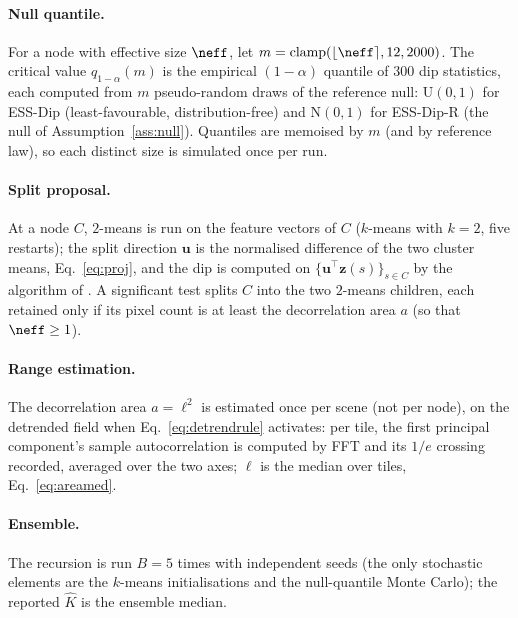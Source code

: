 \paragraph{Null quantile.}
For a node with effective size $\neff$, let
$m=\operatorname{clamp}(\lfloor\neff\rceil,12,2000)$. The critical value
$q_{1-\alpha}(m)$ is the empirical $(1-\alpha)$ quantile of $300$ dip
statistics, each computed from $m$ pseudo-random draws of the reference null:
$\mathrm{U}(0,1)$ for ESS-Dip (least-favourable, distribution-free) and
$\mathrm{N}(0,1)$ for ESS-Dip-R (the null of Assumption~\ref{ass:null}).
Quantiles are memoised by $m$ (and by reference law), so each distinct size is
simulated once per run.

\paragraph{Split proposal.}
At a node $C$, $2$-means is run on the feature vectors of $C$ ($k$-means with
$k=2$, five restarts); the split direction $\bm u$ is the normalised
difference of the two cluster means, Eq.~\eqref{eq:proj}, and the dip is
computed on $\{\bm u^{\!\top}\bm z(s)\}_{s\in C}$ by the algorithm of
\citet{HartiganHartigan1985}. A significant test splits $C$ into the two
$2$-means children, each retained only if its pixel count is at least the
decorrelation area $a$ (so that $\neff\ge1$).

\paragraph{Range estimation.}
The decorrelation area $a=\ell^2$ is estimated once per scene (not per node),
on the detrended field when Eq.~\eqref{eq:detrendrule} activates: per tile,
the first principal component's sample autocorrelation is computed by FFT and
its $1/e$ crossing recorded, averaged over the two axes; $\ell$ is the median
over tiles, Eq.~\eqref{eq:areamed}.

\paragraph{Ensemble.}
The recursion is run $B=5$ times with independent seeds (the only stochastic
elements are the $k$-means initialisations and the null-quantile Monte Carlo);
the reported $\hat K$ is the ensemble median.
